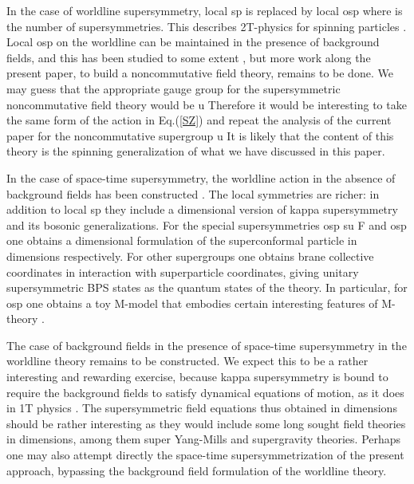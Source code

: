 \documentclass[a4paper,12pt]{article}
\begin{document}
In the case of worldline supersymmetry, local sp\coordHE{} is
replaced by local osp\coordHE{} where \coordHE{} is the number of
supersymmetries. This describes 2T-physics for spinning particles \cite
{spin2t}. Local osp\coordHE{} on the worldline can be maintained
in the presence of background fields, and this has been studied to some
extent \cite{field2T}, but more work along the present paper, to build a
noncommutative field theory, remains to be done. We may guess that the
appropriate gauge group for the supersymmetric noncommutative field theory
would be u\coordHE{} Therefore it would be interesting
to take the same form of the action in Eq.(\ref{SZ}) and repeat the analysis
of the current paper for the noncommutative supergroup u\coordHE{} It is likely that the content of this theory is the spinning
generalization of what we have discussed in this paper.

In the case of space-time supersymmetry, the worldline action in the absence
of background fields has been constructed \cite{super2t}\cite{survey2T}. The
local symmetries are richer: in addition to local sp\coordHE{}
they include a \coordHE{} dimensional version of kappa supersymmetry and its
bosonic generalizations. For the special supersymmetries osp\coordHE{} su\coordHE{} F\myHighlight{$\left( 4\right) $}\coordHE{} and osp\coordHE{} one obtains a \coordHE{} dimensional formulation of the
superconformal particle in \coordHE{} dimensions respectively. For other
supergroups one obtains brane collective coordinates in interaction with
superparticle coordinates, giving unitary supersymmetric BPS states as the
quantum states of the theory. In particular, for osp\coordHE{} one obtains a
toy M-model that embodies certain interesting features of M-theory \cite
{super2t}\cite{survey2T}.

The case of background fields in the presence of space-time supersymmetry in
the worldline theory remains to be constructed. We expect this to be a
rather interesting and rewarding exercise, because kappa supersymmetry is
bound to require the background fields to satisfy dynamical equations of
motion, as it does in 1T physics \cite{wittsusy}. The supersymmetric field
equations thus obtained in \coordHE{} dimensions should be rather interesting as
they would include some long sought field theories in \coordHE{} dimensions,
among them super Yang-Mills and supergravity theories. Perhaps one may also
attempt directly the space-time supersymmetrization of the present approach,
bypassing the background field formulation of the worldline theory.
\end{document}

